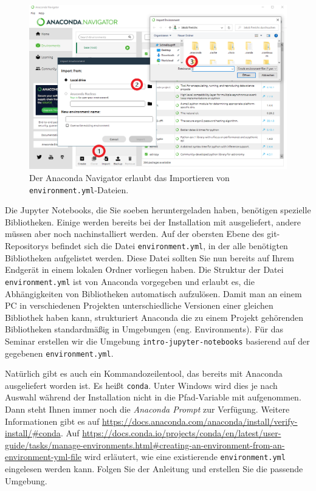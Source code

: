 \documentclass{tufte-handout}
\begin{document}
\begin{figure}[h]
  \includegraphics{anaconda-navigator-import-new-environment--mit-reihenfolge}
  \caption{Der Anaconda Navigator erlaubt das Importieren von \texttt{environment.yml}-Dateien.}%
\label{fig:anaconda-navigator}
\end{figure}

Die Jupyter Notebooks, die Sie soeben heruntergeladen haben, benötigen  spezielle Bibliotheken.
Einige werden bereits bei der Installation mit ausgeliefert, andere müssen aber noch nachinstalliert werden.
Auf der obersten Ebene des git-Repositorys befindet sich die Datei \texttt{environment.yml}, in der alle benötigten Bibliotheken aufgelistet werden.
Diese Datei sollten Sie nun bereits auf Ihrem Endgerät in einem lokalen Ordner vorliegen haben.
Die Struktur der Datei \texttt{environment.yml} ist von Anaconda vorgegeben und erlaubt es, die Abhängigkeiten von Bibliotheken automatisch aufzulösen.
Damit man an einem PC in verschiedenen Projekten unterschiedliche Versionen einer gleichen Bibliothek haben kann,
strukturiert Anaconda die zu einem Projekt gehörenden Bibliotheken standardmäßig in Umgebungen (eng. Environments).
Für das Seminar erstellen wir die Umgebung \texttt{intro-jupyter-notebooks} basierend auf der gegebenen \texttt{environment.yml}.

Natürlich gibt es auch ein Kommandozeilentool, das bereits mit Anaconda ausgeliefert worden ist.
Es heißt \texttt{conda}.
Unter Windows wird dies je nach Auswahl während der Installation nicht in die Pfad-Variable mit aufgenommen.
Dann steht Ihnen immer noch die \emph{Anaconda Prompt} zur Verfügung.
Weitere Informationen gibt es auf
\url{https://docs.anaconda.com/anaconda/install/verify-install/#conda}.
Auf
\url{https://docs.conda.io/projects/conda/en/latest/user-guide/tasks/manage-environments.html#creating-an-environment-from-an-environment-yml-file}
wird erläutert, wie eine existierende \texttt{environment.yml} eingelesen werden kann.
Folgen Sie der Anleitung und erstellen Sie die passende Umgebung.
\end{document}
